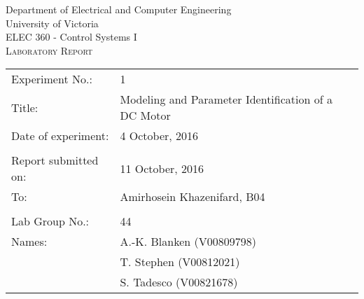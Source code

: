 \begin{titlepage}

\begin{center}
	\begin{LARGE}
		Department of Electrical and Computer Engineering \\
		University of Victoria \\
		ELEC 360 - Control Systems I \\[1cm]
		\textsc{Laboratory Report}
		\\[1cm]
	\end{LARGE}
\end{center}

\begin{tabular}{ p{} p{} }
	Experiment No.: & 1 \\ 
	Title: & Modeling and Parameter Identification of a DC Motor \\ 
	Date of experiment:& 4 October, 2016 \\ 
	& \\
	Report submitted on:& 11 October, 2016 \\ 
	To: & Amirhosein Khazenifard, B04 \\ 
	& \\
  Lab Group No.: & 44 \\
	Names: & A.-K. Blanken (V00809798)\\
	& T. Stephen (V00812021) \\
  & S. Tadesco (V00821678)
\end{tabular}

\end{titlepage}
